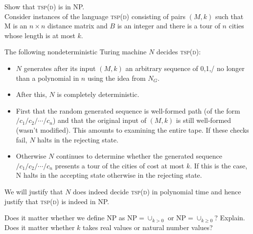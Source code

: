 \frmrule




\frmrule









\frmrule

\begin{example}
Show that \textsc{tsp(d)} is in NP. \\

Consider instances of the language \textsc{tsp(d)} consisting of pairs $(M, k)$ such that M
is an $n \times n$ distance matrix and $B$ is an integer and there is a tour of 
$n$ cities whose length is at most $k$. 

The following nondeterministic Turing machine $N$ decides \textsc{tsp(d)}:
\begin{itemize}   
\renewcommand{\labelitemi}{$\Box$}
\item $N$ generates after its input $(M, k)$ an arbitrary sequence of 0,1,/ 
no longer than a polynomial in $n$ using the idea from $N_G$.
\item After this, $N$ is completely deterministic. 
\item First that the random generated sequence is well-formed path (of 
the form $/c_1/c_2/\cdots/c_n$) and 
that the original input of $(M, k)$ is still well-formed (wasn't modified).
This amounts to examining the entire tape. If these checks fail, 
$N$ halts in the rejecting state. 
\item Otherwise $N$ continues to determine whether the generated sequence
$/c_1/c_2/\cdots/c_n$ presents a tour of the cities of cost at most $k$.
If this is the case, N halts in the accepting state otherwise in the rejecting state.
\end{itemize}

We will justify that $N$ does indeed decide \textsc{tsp(d)} in polynomial time and hence 
justify that \textsc{tsp(d)} is indeed in NP. 

\end{example}


\frmrule

\begin{example}
Does it matter whether we define NP as $\text{NP} = \cup_{k>0}$ or $\text{NP} = \cup_{k \geqslant 0}$? Explain.
Does it matter whether $k$ takes real values or natural number values? 
\end{example}

